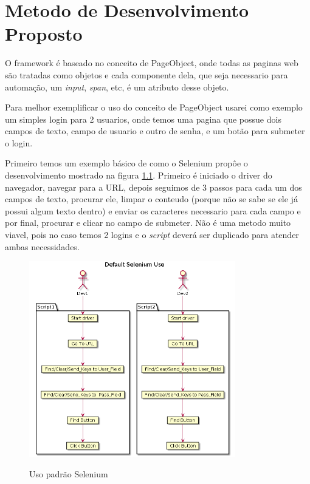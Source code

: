 %
%

\chapter{Metodo de Desenvolvimento Proposto}

    O framework é baseado no conceito de PageObject, onde todas as paginas web são tratadas como objetos
    e cada componente dela, que seja necessario para automação, um \emph{input}, \emph{span}, etc, é um
    atributo desse objeto.

    Para melhor exemplificar o uso do conceito de PageObject usarei como exemplo um simples login para 2
    usuarios, onde temos uma pagina que possue dois campos de texto, campo de usuario e outro de senha,
    e um botão para submeter o login.

    Primeiro temos um exemplo básico de como o Selenium propôe o desenvolvimento mostrado na figura
    \ref{fig:selenium_default}. Primeiro é iniciado o driver do navegador, navegar para a URL, depois
    seguimos de 3 passos para cada um dos campos de texto, procurar ele, limpar o conteudo
    (porque não se sabe se ele já possui algum texto dentro) e enviar os caracteres necessario para
    cada campo e por final, procurar e clicar no campo de submeter. Não é uma metodo muito viavel, pois
    no caso temos 2 logins e o \emph{script} deverá ser duplicado para atender ambas necessidades.

    \begin{figure}[H]
        \vspace*{0,3cm}
        \centering
        \caption{Uso padrão Selenium}
        \includegraphics[width=0.8\textwidth]{./04-figuras/page_object_selenium}
        \label{fig:selenium_default}
    \end{figure}

